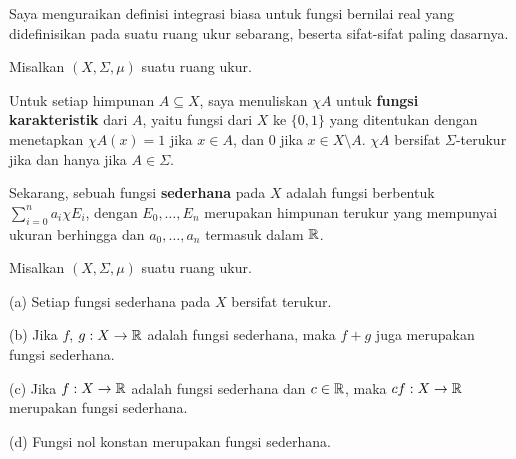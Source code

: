 
\def\chaptername{Integrasi}
\def\sectionname{Definisi integral}


Saya menguraikan definisi integrasi biasa untuk fungsi bernilai real
yang didefinisikan pada suatu ruang ukur sebarang, beserta sifat-sifat
paling dasarnya.

  Misalkan $(X,\Sigma,\mu)$ suatu ruang ukur.

 Untuk setiap himpunan $A\subseteq X$, saya menuliskan
$\chi A$ untuk
{\bf fungsi karakteristik} dari $A$, yaitu fungsi
dari $X$ ke $\{0,1\}$ yang ditentukan dengan menetapkan $\chi A(x)=1$ jika $x\in A$, dan $0$
jika
$x\in X\setminus A$.   
 $\chi A$ bersifat $\Sigma$-terukur jika dan hanya jika $A\in\Sigma$.

 Sekarang, sebuah fungsi {\bf sederhana} pada $X$ adalah
fungsi
berbentuk
$\sum_{i=0}^n a_i\chi E_i$, dengan $E_0,\ldots,E_n$ merupakan himpunan
terukur yang mempunyai ukuran berhingga dan $a_0,\ldots, a_n$ termasuk dalam
$\Bbb R$.   

 Misalkan $(X,\Sigma,\mu)$ suatu ruang ukur.

(a) Setiap fungsi sederhana pada $X$ bersifat terukur.

(b) Jika $f$, $g:X\to\Bbb R$ adalah fungsi sederhana, maka $f+g$ juga
merupakan fungsi sederhana.

(c) Jika $f:X\to \Bbb R$ adalah fungsi sederhana dan $c\in\Bbb R$, maka
$cf:X\to\Bbb R$ merupakan fungsi sederhana.

(d) Fungsi nol konstan merupakan fungsi sederhana.


